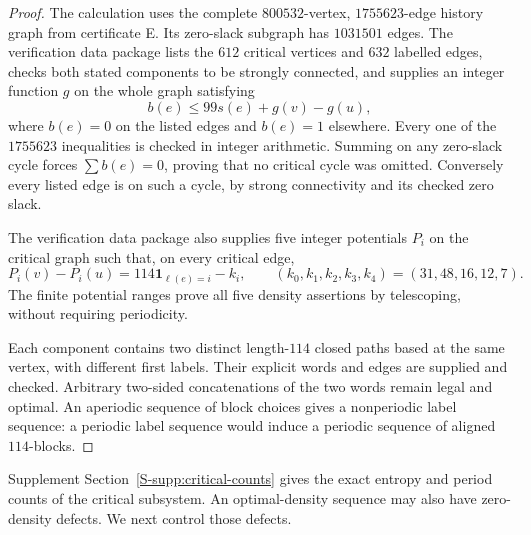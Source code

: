 \documentclass[11pt,reqno]{amsart}
\theoremstyle{plain}
\theoremstyle{plain}
\theoremstyle{plain}
\begin{document}
\begin{proof}
The calculation uses the complete $800532$-vertex, $1755623$-edge history
graph from certificate E. Its zero-slack subgraph has $1031501$ edges.
The verification data package lists the $612$ critical vertices and $632$ labelled edges,
checks both stated components to be strongly connected, and supplies an
integer function $g$ on the whole graph satisfying
\begin{equation}\label{M-eq:critical-bad-edge}
 b(e)\le99s(e)+g(v)-g(u),
\end{equation}
where $b(e)=0$ on the listed edges and $b(e)=1$ elsewhere.
Every one of the $1755623$ inequalities is checked in integer arithmetic.
Summing on any zero-slack cycle forces $\sum b(e)=0$, proving that no
critical cycle was omitted. Conversely every listed edge is on such a
cycle, by strong connectivity and its checked zero slack.

The verification data package also supplies five integer potentials $P_i$ on the critical
graph such that, on every critical edge,
\[
 P_i(v)-P_i(u)=114\mathbf1_{\ell(e)=i}-k_i,
 \qquad(k_0,k_1,k_2,k_3,k_4)=(31,48,16,12,7).
\]
The finite potential ranges prove all five density assertions by
telescoping, without requiring periodicity.

Each component contains two distinct length-$114$ closed paths based at
the same vertex, with different first labels. Their explicit words and
edges are supplied and checked. Arbitrary two-sided concatenations of the
two words remain legal and optimal. An aperiodic sequence of block choices
gives a nonperiodic label sequence: a periodic label sequence would induce
a periodic sequence of aligned $114$-blocks.

\end{proof}

Supplement Section~\ref*{S-supp:critical-counts} gives the exact entropy
and period counts of the critical subsystem. An optimal-density sequence
may also have zero-density defects. We next control those defects.
\end{document}
